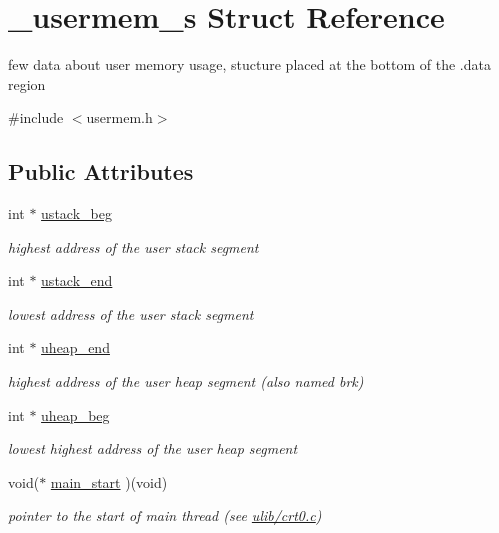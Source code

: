 \hypertarget{struct__usermem__s}{\section{\-\_\-usermem\-\_\-s Struct Reference}
\label{struct__usermem__s}
}


few data about user memory usage, stucture placed at the bottom of the .data region  




{\ttfamily \#include $<$usermem.\-h$>$}

\subsection*{Public Attributes}
\begin{DoxyCompactItemize}
\item 
int $\ast$ \hyperlink{struct__usermem__s_a2fd1c0d0e8502f93210c3a30d3746d06}{ustack\-\_\-beg}
\begin{DoxyCompactList}\small\item\em highest address of the user stack segment \end{DoxyCompactList}\item 
int $\ast$ \hyperlink{struct__usermem__s_a2ff86fc41cdbe6063962b5be6aef49fc}{ustack\-\_\-end}
\begin{DoxyCompactList}\small\item\em lowest address of the user stack segment \end{DoxyCompactList}\item 
int $\ast$ \hyperlink{struct__usermem__s_afc2d87db58cb56804172f98d124d3c05}{uheap\-\_\-end}
\begin{DoxyCompactList}\small\item\em highest address of the user heap segment (also named brk) \end{DoxyCompactList}\item 
int $\ast$ \hyperlink{struct__usermem__s_a0ada31d8a3c5cd0a5d82fe3b0ea7bbe7}{uheap\-\_\-beg}
\begin{DoxyCompactList}\small\item\em lowest highest address of the user heap segment \end{DoxyCompactList}\item 
void($\ast$ \hyperlink{struct__usermem__s_aeb4637b2b234d4b2b4c3963bc580b993}{main\-\_\-start} )(void)
\begin{DoxyCompactList}\small\item\em pointer to the start of main thread (see \hyperlink{crt0_8c}{ulib/crt0.\-c}) \end{DoxyCompactList}\item 

\end{DoxyCompactItemize}
